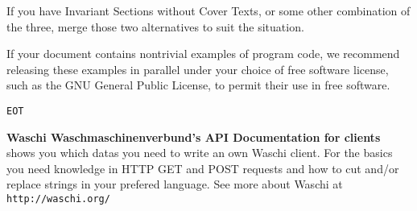 \documentclass[letterpaper,twoside]{scrartcl}
\begin{document}
   If you have Invariant Sections without Cover Texts, or some other
   combination of the three, merge those two alternatives to suit the
   situation.

   If your document contains nontrivial examples of program code, we
   recommend releasing these examples in parallel under your choice of
   free software license, such as the GNU General Public License,
   to permit their use in free software.






  \begin{center}
   \vspace*{\fill}
   \texttt{\Huge{EOT}}
   \vfill
  \end{center}

 \newpage

 \fancyhf{}

 
 \textbf{Waschi Waschmaschinenverbund's API Documentation for clients} shows you which datas you need to write an own Waschi client. 
 For the basics you need knowledge in HTTP GET and POST requests and how to cut and/or replace strings in your prefered language.
 \newline
 \newline
 See more about Waschi at \texttt{http://waschi.org/}
 
\end{document}
